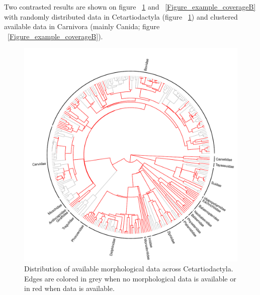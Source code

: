 \documentclass[12pt,letterpaper]{article}
\begin{document}
Two contrasted results are shown on figure ~\ref{Figure_example_coverageA} and ~\ref{Figure_example_coverageB} with randomly distributed data in Cetartiodactyla (figure ~\ref{Figure_example_coverageA}) and clustered available data in Carnivora (mainly Canida; figure ~\ref{Figure_example_coverageB}). 
\begin{figure}[!htbp]
\centering
    \includegraphics[width=1\textwidth]{example_coverageA.pdf}
\caption{Distribution of available morphological data across Cetartiodactyla. Edges are colored in grey when no morphological data is available or in red when data is available.}
\label{Figure_example_coverageA}
\end{figure}
\end{document}
